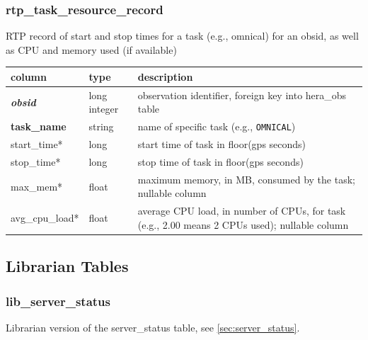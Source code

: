 \documentclass{article}
\begin{document}
{\subsubsection{rtp\_task\_resource\_record}
RTP record of start and stop times for a task (e.g., omnical) for an obsid, as well as CPU and memory used (if available)
\begin{center}
  \begin{tabular}{| p{4cm} | p{2cm} | p{10cm} |}
\hline
 column & type & description \\ [0.5ex] \hline\hline
\textit{\textbf{obsid}} & long integer & observation identifier, foreign key into hera\_obs table \\ \hline
\textbf{task\_name} & string & name of specific task (e.g., \verb+OMNICAL+) \\ \hline
start\_time* & long & start time of task in floor(gps seconds) \\ \hline
stop\_time* & long & stop time of task in floor(gps seconds) \\ \hline
max\_mem* & float & maximum memory, in MB, consumed by the task; nullable column \\ \hline
avg\_cpu\_load* & float & average CPU load, in number of CPUs, for task (e.g., 2.00 means 2 CPUs used); nullable column \\ \hline
\end{tabular}
\end{center}




\subsection{Librarian Tables}
\subsubsection{lib\_server\_status}
Librarian version of the server\_status table, see \ref{sec:server_status}.

}
\end{document}
